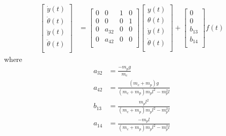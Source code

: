 \begin{equation}
\begin{aligned}
	\begin{bmatrix}
		\dot{y}(t)\\
		\dot{\theta}(t)\\
		\ddot{y}(t)\\
		\ddot{\theta}(t)\\
	\end{bmatrix}
	&=
	\begin{bmatrix}
		0 & 0 & 1 & 0\\
		0 & 0 & 0 & 1\\
		0 & a_{32} & 0 & 0\\
		0 & a_{42} & 0 & 0\\
	\end{bmatrix}
	\begin{bmatrix}
		y(t)\\
		\theta(t)\\
		\dot{y}(t)\\
		\dot{\theta}(t)\\
	\end{bmatrix}
	+
	\begin{bmatrix}
		0\\
		0\\
		b_{13}\\
		b_{14}\\
	\end{bmatrix}
	f(t)
\end{aligned}
\end{equation}
where
\begin{subequations}
\begin{align}
	a_{32} &= \frac{-m_{p}g}{m_{c}}\\
	a_{42} &= \frac{(m_{c} + m_{p})g}{(m_{c} + m_{p})m_{p}l^{2} - m_{p}^{2}l}\\
	b_{13} &= \frac{m_{p}l^{2}}{(m_{c} + m_{p})m_{p}l^{2} - m_{p}^{2}l}\\
	a_{14} &= \frac{-m_{p}l}{(m_{c} + m_{p})m_{p}l^{2} - m_{p}^{2}l}
\end{align}
\end{subequations}

